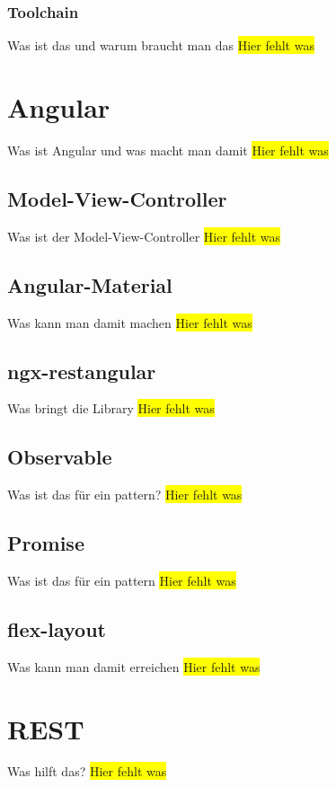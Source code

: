 \subsubsection{Toolchain}
Was ist das und warum braucht man das
\colorbox{yellow}{Hier fehlt was}

\section{Angular}
Was ist Angular und was macht man damit
\colorbox{yellow}{Hier fehlt was}

\subsection{Model-View-Controller}
Was ist der Model-View-Controller
\colorbox{yellow}{Hier fehlt was}

\subsection{Angular-Material}
Was kann man damit machen
\colorbox{yellow}{Hier fehlt was}

\subsection{ngx-restangular}
Was bringt die Library
\colorbox{yellow}{Hier fehlt was}

\subsection{Observable}
Was ist das für ein pattern?
\colorbox{yellow}{Hier fehlt was}

\subsection{Promise}
Was ist das für ein pattern
\colorbox{yellow}{Hier fehlt was}

\subsection{flex-layout}
Was kann man damit erreichen
\colorbox{yellow}{Hier fehlt was}

\section{REST}
Was hilft das?
\colorbox{yellow}{Hier fehlt was}


